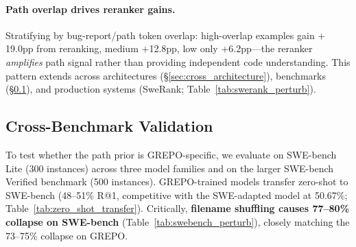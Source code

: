 \documentclass{article}
\begin{document}
\paragraph{Path overlap drives reranker gains.}
Stratifying by bug-report/path token overlap: high-overlap examples gain $+$19.0pp from reranking, medium $+$12.8pp, low only $+$6.2pp---the reranker \emph{amplifies} path signal rather than providing independent code understanding.
This pattern extends across architectures (\S\ref{sec:cross_architecture}), benchmarks (\S\ref{sec:cross_benchmark}), and production systems (SweRank; Table~\ref{tab:swerank_perturb}).

\subsection{Cross-Benchmark Validation}
\label{sec:cross_benchmark}

To test whether the path prior is GREPO-specific, we evaluate on SWE-bench Lite (300 instances) across three model families and on the larger SWE-bench Verified benchmark (500 instances).
GREPO-trained models transfer zero-shot to SWE-bench (48--51\% R@1, competitive with the SWE-adapted model at 50.67\%; Table~\ref{tab:zero_shot_transfer}).
Critically, \textbf{filename shuffling causes 77--80\% collapse on SWE-bench} (Table~\ref{tab:swebench_perturb}), closely matching the 73--75\% collapse on GREPO.
\end{document}
